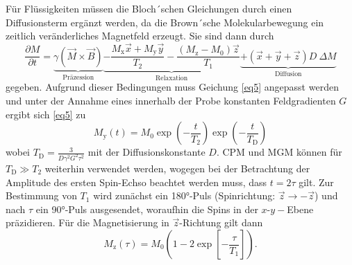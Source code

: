 Für Flüssigkeiten müssen die Bloch´schen Gleichungen durch einen Diffusionsterm ergänzt 
werden, da die Brown´sche Molekularbewegung ein zeitlich veränderliches 
Magnetfeld erzeugt. Sie sind dann durch  
\begin{equation}
  \frac{\partial M}{\partial t} =
  \underbrace{\gamma \left(\vec{M} \times \vec{B}\right)}_{\text{Präzession}}
  \underbrace{- \frac{M_\text{x} \vec{x} + M_\text{y} \vec{y}}{T_2}
  - \frac{\left(M_\text{z} - M_0\right) \vec{z}}{T_1}}_{\text{Relaxation}}
  \underbrace{+ \left(\vec{x} + \vec{y} + \vec{z}\right) D\:\Delta M}_{\text{Diffusion}}
  \label{eq6}
\end{equation}
gegeben. Aufgrund dieser Bedingungen muss Geichung \ref{eq5} angepasst werden und 
unter der Annahme eines innerhalb der Probe konstanten Feldgradienten $G$ ergibt  
sich \ref{eq5} zu
\begin{equation}
  M_\text{y}\!\left(t\right) = M_0
  \exp\!\left(- \frac{t}{T_2}\right)
  \exp\!\left(- \frac{t}{T_\text{D}}\right)
  \label{eq7}
\end{equation}
wobei $T_{\text{D}} = \frac{3}{D \gamma^2 G^2 \tau^2}$ mit der Diffusionskonstante $D$.
CPM und MGM können für $T_{\text{D}} \gg T_{\text{2}}$ weiterhin verwendet werden, 
wogegen bei der Betrachtung der Amplitude des ersten Spin-Echso beachtet werden 
muss, dass $t=2\tau$ gilt.
Zur Bestimmung von $T_{\text{1}}$ wird zunächst ein 180°-Puls (Spinrichtung: 
$\vec{z} \rightarrow -\vec{z}$) und nach $\tau$ ein 90°-Puls ausgesendet, 
woraufhin die Spins in der $x$-$y-$Ebene präzidieren. Für die Magnetisierung in 
$\vec{z}$-Richtung gilt dann
\begin{equation}
  M_\text{z}\!\left(\tau\right) =
  M_0 \left(1 - 2 \exp\!\left[-\frac{\tau}{T_1}\right]\right).
  \label{eq8}
\end{equation}

\cite{theo1}
